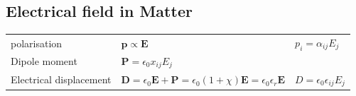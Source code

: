	\renewcommand{\arraystretch}{1.2}

	\subsection{Electrical field in Matter}
		\begin{tabularx}{\columnwidth}{lXX}
			polarisation & $\mathbf{p} \propto \mathbf{E}$ & $p_i = \alpha_{ij}E_j$\\
			Dipole moment & $\mathbf{P} = \epsilon_0 x_{ij} E_j$ &\\
			Electrical displacement & $\mathbf{D} = \epsilon_0\mathbf{E} + \mathbf{P} = \epsilon_0 (1+\chi)\mathbf{E} = \epsilon_0\epsilon_r\mathbf{E}$&
			$D = \epsilon_0\epsilon_{ij}E_j$\\
			
		\end{tabularx}

